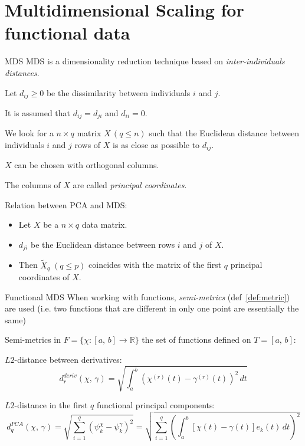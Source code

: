 %
\section{Multidimensional Scaling for functional data}%

\begin{recap}{MDS}{}
MDS is a dimensionality reduction technique based on \emph{inter-individuals distances}.

Let $d_{ij} \geq 0$ be the dissimilarity between individuals $i$ and $j$.

It is assumed that $d_{ij} = d_{ji}$ and $d_{ii} = 0$.

We look for a $n \times q$ matrix $X\, (q \leq n)$ such that
the Euclidean distance between individuals $i$ and $j$ rows of $X$ is
as close as possible to $d_{ij}$.

$X$ can be chosen with orthogonal columns.

The columns of $X$ are called \emph{principal coordinates}.

\tcbline
Relation between PCA and MDS:
\begin{itemize}
    \item Let $X$ be a $n \times q$ data matrix.
    \item $d_{ji}$ be the Euclidean distance between rows $i$ and $j$ of $X$.
    \item Then $\tilde X_q\;(q \leq p)$ coincides with the matrix of the first
        $q$ principal coordinates of $X$.
\end{itemize}
\end{recap}

\begin{definition}{Functional MDS}{}
    When working with functions, \emph{semi-metrics} (def~\ref{def:metric}) are used (i.e. two
    functions that are different in only one point are essentially the same)
\end{definition}

\begin{example}{Semi-metrics in $F = \{\chi : [a,\,b] \to \mathds R\}$}{}
    the set of functions defined on $T = [a,\,b]$:

    $L2$-distance between derivatives:
    \begin{equation*}
        d_r^{deriv}(\chi,\,\gamma) = \sqrt{
            \int_a^b \left(
                \chi^{(r)}(t) - \gamma^{(r)}(t)
            \right)^2 \,dt
        }
    \end{equation*}

    $L2$-distance in the first $q$ functional principal components:
    \begin{equation*}
        d_q^{PCA}(\chi,\,\gamma) = \sqrt{
            \sum_{i=1}^q \left(
                \psi_k^\chi - \psi_k^\gamma
            \right)^2
        } = \sqrt{
            \sum_{i=1}^q \left(
                \int_a^b \left[
                    \chi(t) - \gamma(t)
                \right] e_k(t) \,dt
            \right)^2
        }
    \end{equation*}
\end{example}

